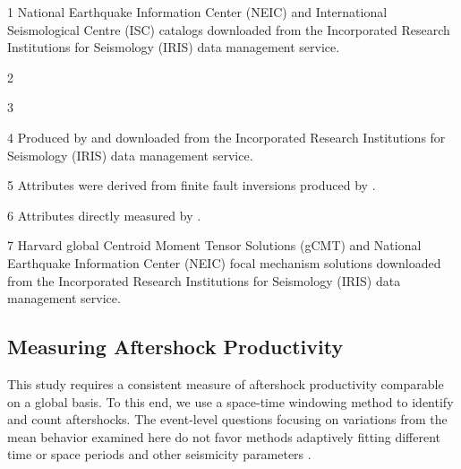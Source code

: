 \documentclass[draft, jgrga]{agujournal2018}
\begin{document}
\begin{table}[]
\begin{threeparttable}
    \begin{tablenotes}
        \item[1] National Earthquake Information Center (NEIC) and International Seismological Centre (ISC) catalogs downloaded from the Incorporated Research Institutions for Seismology (IRIS) data management service.
        \item[2] \citet{Bird2003AnBoundaries}
        \item[3] \citet{Muller2008}
        \item[4] Produced by \citet{Convers2011GlobalMid2010} and downloaded from the Incorporated Research Institutions for Seismology (IRIS) data management service.
        \item[5] Attributes were derived from finite fault inversions produced by \citet{Hayes2017}.
        \item[6] Attributes directly measured by \citet{Hayes2017}.
        \item[7] Harvard global Centroid Moment Tensor Solutions (gCMT) and National Earthquake Information Center (NEIC) focal mechanism solutions downloaded from the Incorporated Research Institutions for Seismology (IRIS) data management service.

    \end{tablenotes}

\end{threeparttable}

\end{table}



    \subsection{Measuring Aftershock Productivity}

This study requires a consistent measure of aftershock productivity comparable on a global basis. To this end, we use a space-time windowing method to identify and count aftershocks. The event-level questions focusing on variations from the mean behavior examined here do not favor methods adaptively fitting different time or space periods and other seismicity parameters \citep[e.g.][]{ogata2017statistics}.  \citet{Zaliapin2008} 
\end{document}
